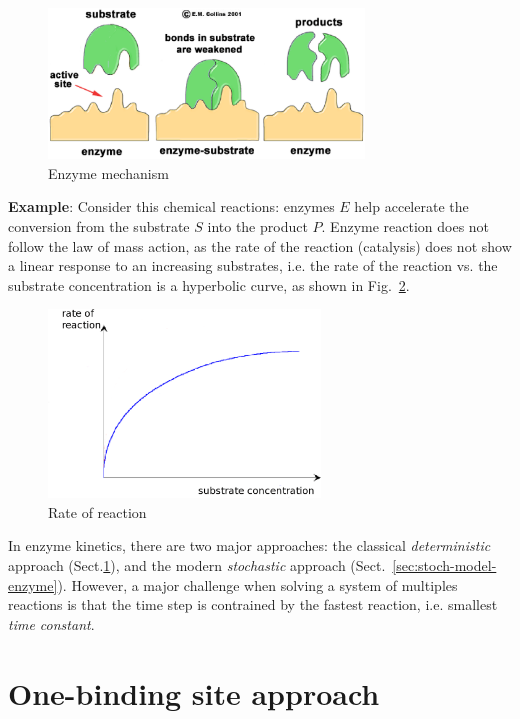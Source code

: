 \begin{figure}[hbt]
 \centerline{\includegraphics[height=4cm]{./images/enzyme_substrate.eps}}
\caption{Enzyme mechanism}
\label{fig:enzyme_subs}
\end{figure}


{\bf Example}: Consider this chemical reactions: enzymes $E$ help
accelerate the conversion from the substrate $S$ into the product
$P$. Enzyme reaction does not follow the law of mass action, as the
rate of the reaction (catalysis) does not show a linear response to an
increasing substrates, i.e. the rate of the reaction vs. the substrate
concentration is a hyperbolic curve, as shown in
Fig.~\ref{fig:rate_reaction}.

\begin{figure}[hbt]
 \centerline{\includegraphics[height=5cm]{./images/rate_reaction.eps}}
 \caption{Rate of reaction}
 \label{fig:rate_reaction}
\end{figure}


In enzyme kinetics, there are two major approaches: the classical {\it
deterministic} approach (Sect.\ref{sec:enzyme-kinetics-deterministic}), and the
modern {\it stochastic} approach (Sect.~\ref{sec:stoch-model-enzyme}). However,
a major challenge when solving a system of multiples reactions is that the time
step is contrained by the fastest reaction, i.e. smallest {\it time constant}.


\section{One-binding site approach}
\label{sec:enzyme-kinetics-deterministic}

